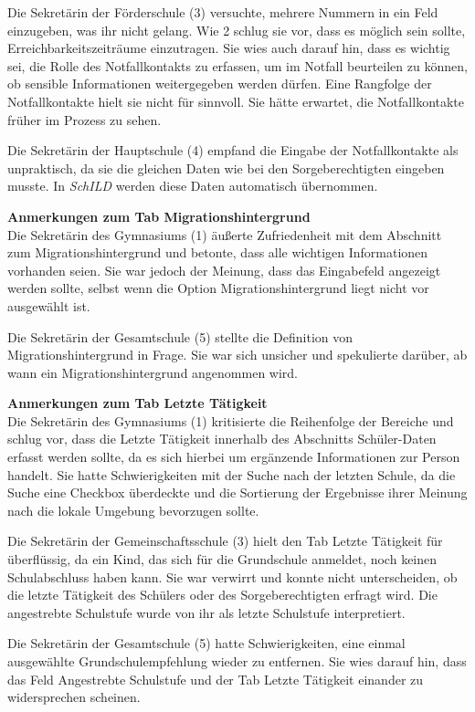 Die Sekretärin der Förderschule (3) versuchte, mehrere Nummern in ein Feld einzugeben, was ihr nicht gelang. Wie 2 schlug sie vor, dass es möglich sein sollte, Erreichbarkeitszeiträume einzutragen. Sie wies auch darauf hin, dass es wichtig sei, die Rolle des Notfallkontakts zu erfassen, um im Notfall beurteilen zu können, ob sensible Informationen weitergegeben werden dürfen. Eine Rangfolge der Notfallkontakte hielt sie nicht für sinnvoll. Sie hätte erwartet, die Notfallkontakte früher im Prozess zu sehen.

Die Sekretärin der Hauptschule (4) empfand die Eingabe der Notfallkontakte als unpraktisch, da sie die gleichen Daten wie bei den Sorgeberechtigten eingeben musste. In \textit{SchILD} werden diese Daten automatisch übernommen.

\textbf{Anmerkungen zum Tab \glqq Migrationshintergrund\grqq{}}\\
Die Sekretärin des Gymnasiums (1) äußerte Zufriedenheit mit dem Abschnitt zum Migrationshintergrund und betonte, dass alle wichtigen Informationen vorhanden seien. Sie war jedoch der Meinung, dass das Eingabefeld angezeigt werden sollte, selbst wenn die Option \glqq Migrationshintergrund liegt nicht vor\grqq{} ausgewählt ist.

Die Sekretärin der Gesamtschule (5) stellte die Definition von \glqq Migrationshintergrund\grqq{} in Frage. Sie war sich unsicher und spekulierte darüber, ab wann ein Migrationshintergrund angenommen wird.

\textbf{Anmerkungen zum Tab \glqq Letzte Tätigkeit\grqq{}}\\
Die Sekretärin des Gymnasiums (1) kritisierte die Reihenfolge der Bereiche und schlug vor, dass die \glqq Letzte Tätigkeit\grqq{} innerhalb des Abschnitts \glqq Schüler-Daten\grqq{} erfasst werden sollte, da es sich hierbei um ergänzende Informationen zur Person handelt. Sie hatte Schwierigkeiten mit der Suche nach der letzten Schule, da die Suche eine Checkbox überdeckte und die Sortierung der Ergebnisse ihrer Meinung nach die lokale Umgebung bevorzugen sollte.

Die Sekretärin der Gemeinschaftsschule (3) hielt den Tab \glqq Letzte Tätigkeit\grqq{} für überflüssig, da ein Kind, das sich für die Grundschule anmeldet, noch keinen Schulabschluss haben kann. Sie war verwirrt und konnte nicht unterscheiden, ob die letzte Tätigkeit des Schülers oder des Sorgeberechtigten erfragt wird. Die angestrebte Schulstufe wurde von ihr als letzte Schulstufe interpretiert.

Die Sekretärin der Gesamtschule (5) hatte Schwierigkeiten, eine einmal ausgewählte Grundschulempfehlung wieder zu entfernen. Sie wies darauf hin, dass das Feld \glqq Angestrebte Schulstufe\grqq{} und der Tab \glqq Letzte Tätigkeit\grqq{} einander zu widersprechen scheinen.


